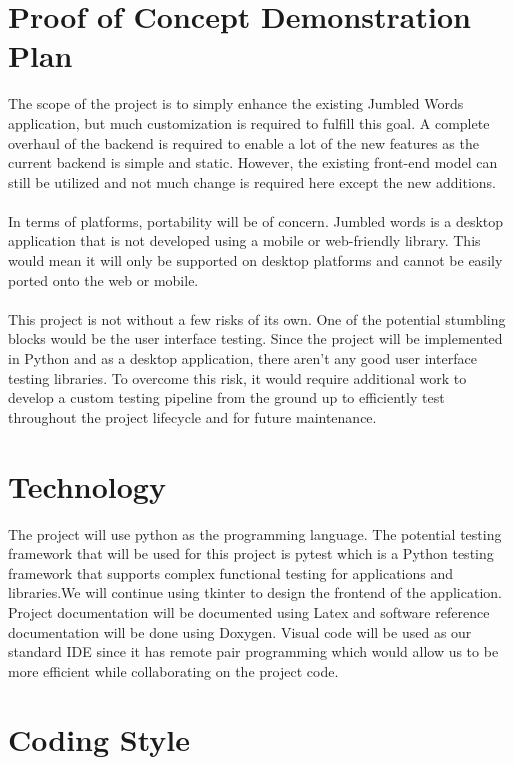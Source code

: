 \documentclass{article}
\begin{document}
\section{Proof of Concept Demonstration Plan}

The scope of the project is to simply enhance the existing Jumbled Words application, but much customization is required to fulfill this goal. A complete overhaul of the backend is required to enable a lot of the new features as the current backend is simple and static. However, the existing front-end model can still be utilized and not much change is required here except the new additions.\\
\\
In terms of platforms, portability will be of concern. Jumbled words is a desktop application that is not developed using a mobile or web-friendly library. This would mean it will only be supported on desktop platforms and cannot be easily ported onto the web or mobile.\\
\\
This project is not without a few risks of its own. One of the potential stumbling blocks would be the user interface testing. Since the project will be implemented in Python and as a desktop application, there aren’t any good user interface testing libraries. To overcome this risk, it would require additional work to develop a custom testing pipeline from the ground up to efficiently test throughout the project lifecycle and for future maintenance. 

\section{Technology}

The project will use python as the programming language. The potential testing framework that will be used for this project is pytest which is a Python testing framework that supports complex functional testing for applications and libraries.We will continue using tkinter to design the frontend of the application. Project documentation will be documented using Latex and software reference documentation will be done using Doxygen. Visual code will be used as our standard IDE since it has remote pair programming which would allow us to be more efficient while collaborating on the project code.

\section{Coding Style}
\end{document}
